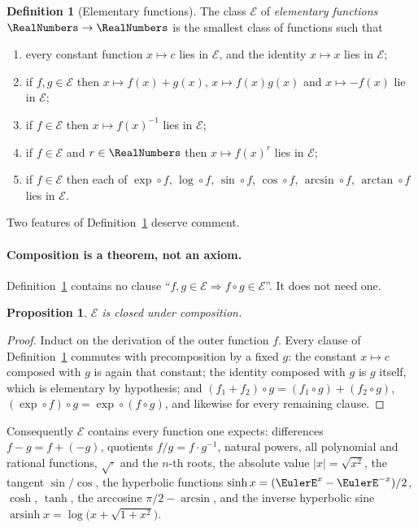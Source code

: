\documentclass[11pt,oneside]{article}
\newtheorem{proposition}[theorem]{Proposition}
\theoremstyle{definition}
\newtheorem{definition}[theorem]{Definition}
\theoremstyle{remark}
\newcommand{\Elem}{\mathcal E}
\begin{document}
\begin{definition}[Elementary functions]\label{def:elem}
The class $\Elem$ of \emph{elementary functions} $\RealNumbers\to\RealNumbers$ is the smallest
class of functions such that
\begin{enumerate}
\item every constant function $x\mapsto c$ lies in $\Elem$, and the identity
      $x\mapsto x$ lies in $\Elem$;
\item if $f,g\in\Elem$ then $x\mapsto f(x)+g(x)$, $x\mapsto f(x)g(x)$ and
      $x\mapsto -f(x)$ lie in $\Elem$;
\item if $f\in\Elem$ then $x\mapsto f(x)^{-1}$ lies in $\Elem$;
\item if $f\in\Elem$ and $r\in\RealNumbers$ then $x\mapsto f(x)^r$ lies in $\Elem$;
\item if $f\in\Elem$ then each of
      $\exp\circ f$, $\log\circ f$, $\sin\circ f$, $\cos\circ f$,
      $\arcsin\circ f$, $\arctan\circ f$ lies in $\Elem$.
\end{enumerate}
\end{definition}

Two features of Definition~\ref{def:elem} deserve comment.

\paragraph{Composition is a theorem, not an axiom.}
Definition~\ref{def:elem} contains no clause ``$f,g\in\Elem\Rightarrow f\circ
g\in\Elem$''.  It does not need one.

\begin{proposition}\label{prop:comp}
$\Elem$ is closed under composition.
\end{proposition}

\begin{proof}
Induct on the derivation of the outer function $f$.  Every clause of
Definition~\ref{def:elem} commutes with precomposition by a fixed $g$: the constant
$x\mapsto c$ composed with $g$ is again that constant; the identity composed
with $g$ is $g$ itself, which is elementary by hypothesis; and
$(f_1+f_2)\circ g=(f_1\circ g)+(f_2\circ g)$, $(\exp\circ f)\circ
g=\exp\circ(f\circ g)$, and likewise for every remaining clause.
\end{proof}

Consequently $\Elem$ contains every function one expects: differences
$f-g=f+(-g)$, quotients $f/g=f\cdot g^{-1}$, natural powers, all polynomial
and rational functions, $\sqrt{\cdot}$ and the $n$-th roots,
the absolute value $|x|=\sqrt{x^2}$, the tangent $\sin/\cos$, the hyperbolic
functions $\sinh x=(\EulerE^x-\EulerE^{-x})/2$, $\cosh$, $\tanh$, the arccosine
$\pi/2-\arcsin$, and the inverse hyperbolic sine
$\operatorname{arsinh}x=\log\bigl(x+\sqrt{1+x^2}\bigr)$.
\end{document}

